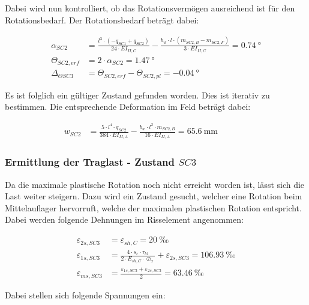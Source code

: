 \documentclass[
  11pt,
  letterpaper,
]{scrreprt}
\begin{document}
Dabei wird nun kontrolliert, ob das Rotationsvermögen ausreichend ist
für den Rotationsbedarf. Der Rotationsbedarf beträgt dabei:

\[
\begin{aligned}
\alpha_{SC2}& = \frac{l^{3} \cdot \left(- q_{SC1} + q_{SC2}\right)}{24 \cdot EI_{II , C}} - \frac{b_{w} \cdot l \cdot \left(m_{SC2 , B} - m_{SC2 , F}\right)}{3 \cdot EI_{II , C}} = 0.74 \ \mathrm{°} \\ 
\Theta_{SC2 , erf}& = 2 \cdot \alpha_{SC2} = 1.47 \ \mathrm{°} \\ 
\Delta_{\Theta SC3}& = \Theta_{SC2 , erf} - \Theta_{SC2 , pl} = -0.04 \ \mathrm{°} \end{aligned}
\]

Es ist folglich ein gültiger Zustand gefunden worden. Dies ist iterativ
zu bestimmen. Die entsprechende Deformation im Feld beträgt dabei:

\[
\begin{aligned}
w_{SC2}& = \frac{5 \cdot l^{4} \cdot q_{SC2}}{384 \cdot EI_{II , A}} - \frac{b_{w} \cdot l^{2} \cdot m_{SC2 , B}}{16 \cdot EI_{II , A}} = 65.6 \ \mathrm{mm} \quad &  \quad &  
 \end{aligned}
\]

\subsubsection{\texorpdfstring{Ermittlung der Traglast - Zustand
\(SC3\)}{Ermittlung der Traglast - Zustand SC3}}\label{ermittlung-der-traglast---zustand-sc3}

Da die maximale plastische Rotation noch nicht erreicht worden ist,
lässt sich die Last weiter steigern. Dazu wird ein Zustand gesucht,
welcher eine Rotation beim Mittelauflager hervorruft, welche der
maximalen plastischen Rotation entspricht. Dabei werden folgende
Dehnungen im Risselement angenommen:

\[
\begin{aligned}
\varepsilon_{2 s , SC3}& = \varepsilon_{sh , C} = 20 \ \mathrm{‰} \\ 
\varepsilon_{1 s , SC3}& = \frac{4 \cdot s_{r} \cdot \tau_{b1}}{2 \cdot E_{sh , C} \cdot \oslash_{x}} + \varepsilon_{2 s , SC3} = 106.93 \ \mathrm{‰} \\ 
\varepsilon_{m s , SC3}& = \frac{\varepsilon_{1 s , SC3} + \varepsilon_{2 s , SC3}}{2} = 63.46 \ \mathrm{‰} \end{aligned}
\]

Dabei stellen sich folgende Spannungen ein:
\end{document}
